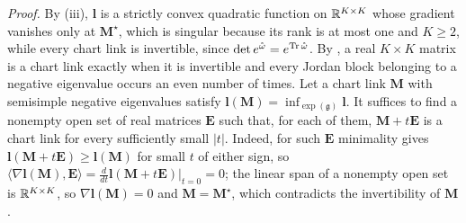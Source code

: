 \noindent\emph{Proof.}
By (iii), \(\mathbf l\) is a strictly convex quadratic function on
\(\mathbb R^{K\times K}\) whose gradient vanishes only at \(\mathbf M^\star\), which is singular because its rank is
at most one and \(K\geq2\), while every chart link is invertible, since
\(\det e^{\mathring\omega}=e^{\operatorname{Tr}\mathring\omega}\). By \citet[Theorem~1]{culver1966existence}, a real
\(K\times K\) matrix is a chart link exactly when it is invertible and every Jordan block belonging to a
negative eigenvalue occurs an even number of times. Let a chart link \(\mathbf M\) with semisimple negative
eigenvalues satisfy \(\mathbf l(\mathbf M)=\inf_{\exp(\mathfrak g)}\mathbf l\). It suffices to find a
nonempty open set of real matrices \(\mathbf E\) such that, for each of them, \(\mathbf M+t\mathbf E\) is a
chart link for every sufficiently small \(\lvert t\rvert\). Indeed, for such \(\mathbf E\) minimality gives
\(\mathbf l(\mathbf M+t\mathbf E)\geq\mathbf l(\mathbf M)\) for small \(t\) of either sign, so
\(\langle\nabla\mathbf l(\mathbf M),\mathbf E\rangle=\frac{d}{dt}\mathbf l(\mathbf M+t\mathbf E)\big|_{t=0}=0\);
the linear span of a nonempty open set is \(\mathbb R^{K\times K}\), so \(\nabla\mathbf l(\mathbf M)=0\) and
\(\mathbf M=\mathbf M^\star\), which contradicts the invertibility of \(\mathbf M\).

